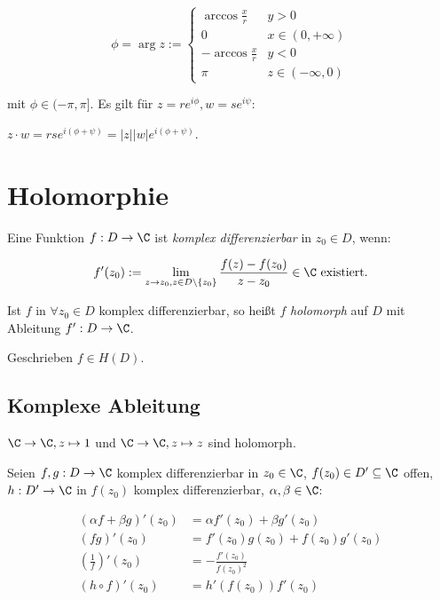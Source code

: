 \vspace*{-2mm}
\[ \phi = \arg z := \begin{cases}
	\arccos \frac{x}{r} & y > 0 \\
	0 & x \in (0,+\infty) \\
	-\arccos \frac{x}{r} & y < 0 \\
	\pi & z \in (-\infty,0)
\end{cases} \]

mit \(\phi \in (-\pi, \pi]\). Es gilt für \(z = re^{i\phi}, w = se^{i\psi}\):

		\(z \cdot w = rse^{i(\phi+\psi)} = |z||w|e^{i(\phi+\psi)}\).

\section*{Holomorphie}

Eine Funktion \(f : D \to \C\) ist \emph{komplex differenzierbar} in \(z_0 \in D\), wenn:

\vspace*{-4mm}
\[ f'(z_0) := \displaystyle\lim_{z \to z_0, z \in D\setminus\{z_0\}} \frac{f(z)-f(z_0)}{z-z_0} \in \C \text{ existiert.} \]

Ist \(f\) in \(\forall z_0 \in D\) komplex differenzierbar, so heißt \(f\) \emph{holomorph} auf \(D\) mit Ableitung \(f' : D \to \C\).

Geschrieben \(f \in H(D)\).

\subsection*{Komplexe Ableitung}

\(\C \to \C, z \mapsto 1\) und \(\C \to \C, z \mapsto z\) sind holomorph.

Seien \(f, g : D \to \C\) komplex differenzierbar in \(z_0 \in \C\), \(f(z_0) \in D' \subseteq \C\) offen, \(h : D' \to \C\) in \(f(z_0)\) komplex differenzierbar, \(\alpha, \beta \in \C\):

\vspace*{-4mm}
\begin{align*}
	(\alpha f + \beta g)'(z_0) &= \alpha f'(z_0) + \beta g'(z_0) \\
	(fg)'(z_0) &= f'(z_0)g(z_0) + f(z_0)g'(z_0) \\
	\left(\frac{1}{f}\right)'(z_0) &= -\frac{f'(z_0)}{f(z_0)^2} \\
	(h \circ f)'(z_0) &= h'(f(z_0))f'(z_0)
\end{align*}

